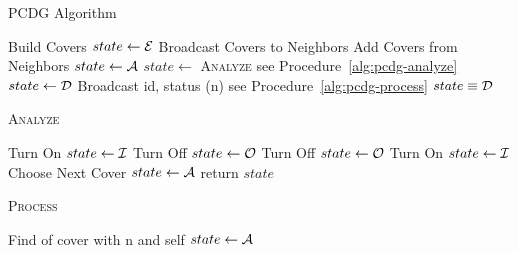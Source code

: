 \begin{algorithm}
\caption{PCDG Algorithm}
\begin{algorithmic}[1]
\Repeat
\Case [state]{}
\When [\cBd] {}
\State Build Covers
\State $state \gets {\mathcal E}$
\When [\cEd] {}
\DoTimes [2]
\State Broadcast Covers \Comment to Neighbors
\State Add Covers \Comment from Neighbors
\EndTimes
\State $state \gets {\mathcal A}$
\When [\cAd]
\State $state \gets$ {\scshape Analyze} \Comment see Procedure~\ref{alg:pcdg-analyze}
\When [\cId, \cOd]
\State $state \gets {\mathcal D}$
\EndCase
\State Broadcast id, status
(n)  \Comment see Procedure~\ref{alg:pcdg-process}
\EndFor
\Until $state \equiv {\mathcal D}$
\EndFor
\end{algorithmic}
\label{alg:pcdg}
\end{algorithm}

\begin{subalgorithms}
\begin{algorithm}
\caption{{\scshape Analyze}}
\begin{algorithmic}[1]
\State Turn On
\State $state \gets {\mathcal I}$
\Else
\State Turn Off
\State $state \gets {\mathcal O}$
\EndIf
{}
\State Turn Off
\State $state \gets {\mathcal O}$
\State Turn On
\State $state \gets {\mathcal I}$
\Else
\State Choose Next Cover
\State $state \gets {\mathcal A}$
\EndIf
\State return $state$
\EndProcedure
\end{algorithmic}
\label{alg:pcdg-analyze}
\end{algorithm}

\begin{algorithm}
\caption{{\scshape Process}}
\begin{algorithmic}[1]
\State Find of cover with n and self
\EndIf
\EndIf
{}
\State $state \gets {\mathcal A}$
\EndIf 
\EndProcedure
\end{algorithmic}
\label{alg:pcdg-process}
\end{algorithm}
\end{subalgorithms}